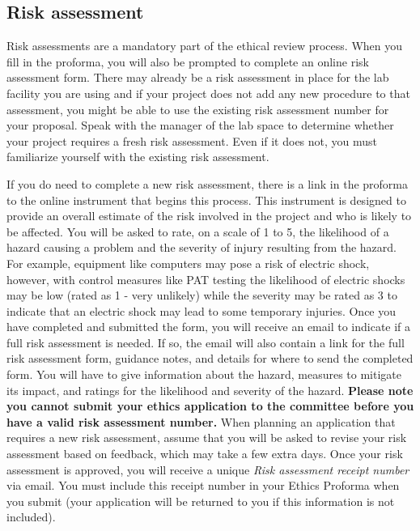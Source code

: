 \documentclass[
  12pt,
]{book}
\begin{document}
\subsection{Risk assessment}\label{risk-assessment}

Risk assessments are a mandatory part of the ethical review process. When you fill in the proforma, you will also be prompted to complete an online risk assessment form. There may already be a risk assessment in place for the lab facility you are using and if your project does not add any new procedure to that assessment, you might be able to use the existing risk assessment number for your proposal. Speak with the manager of the lab space to determine whether your project requires a fresh risk assessment. Even if it does not, you must familiarize yourself with the existing risk assessment.

If you do need to complete a new risk assessment, there is a link in the proforma to the online instrument that begins this process. This instrument is designed to provide an overall estimate of the risk involved in the project and who is likely to be affected. You will be asked to rate, on a scale of 1 to 5, the likelihood of a hazard causing a problem and the severity of injury resulting from the hazard. For example, equipment like computers may pose a risk of electric shock, however, with control measures like PAT testing the likelihood of electric shocks may be low (rated as 1 - very unlikely) while the severity may be rated as 3 to indicate that an electric shock may lead to some temporary injuries. Once you have completed and submitted the form, you will receive an email to indicate if a full risk assessment is needed. If so, the email will also contain a link for the full risk assessment form, guidance notes, and details for where to send the completed form. You will have to give information about the hazard, measures to mitigate its impact, and ratings for the likelihood and severity of the hazard. \textbf{Please note you cannot submit your ethics application to the committee before you have a valid risk assessment number.} When planning an application that requires a new risk assessment, assume that you will be asked to revise your risk assessment based on feedback, which may take a few extra days. Once your risk assessment is approved, you will receive a unique \emph{Risk assessment receipt number} via email. You must include this receipt number in your Ethics Proforma when you submit (your application will be returned to you if this information is not included).
\end{document}
